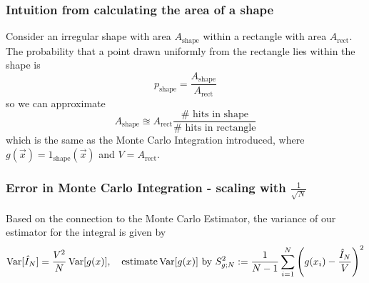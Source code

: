 \subsubsection{Intuition from calculating the area of a shape}
Consider an irregular shape with area $A_{\text{shape}}$ within a rectangle with area $A_{\text{rect}}$. 
The probability that a point drawn uniformly from the rectangle lies within the shape is 
\begin{equation}
    p_{\text{shape}} = \frac{A_{\text{shape}}}{A_{\text{rect}}}
\end{equation}
so we can approximate
\begin{equation}
    A_{\text{shape}}\approxeq A_{\text{rect}} \frac{\# \text{ hits in shape}}{\# \text{ hits in rectangle}}
\end{equation}
which is the same as the Monte Carlo Integration introduced, where $g(\vec{x}) = 1_{\text{shape}}(\vec{x})$ and $V = A_{\text{rect}}$.

\subsubsection{Error in Monte Carlo Integration - scaling with $\frac{1}{\sqrt{N}}$}
Based on the connection to the Monte Carlo Estimator, the
variance of our estimator for the integral is given by
\begin{equation}
    \operatorname{Var}[\hat{I}_N] = \frac{V^2}{N} \operatorname{Var}[g(x)], \quad \text{estimate} \operatorname{Var}[g(x)] \text{ by } S_{g;N}^2 := \frac{1}{N-1} \sum_{i=1}^{N} \left(g(x_i) - \frac{\hat{I}_N}{V}\right)^2
    \label{eq:mcint_var}
\end{equation}

